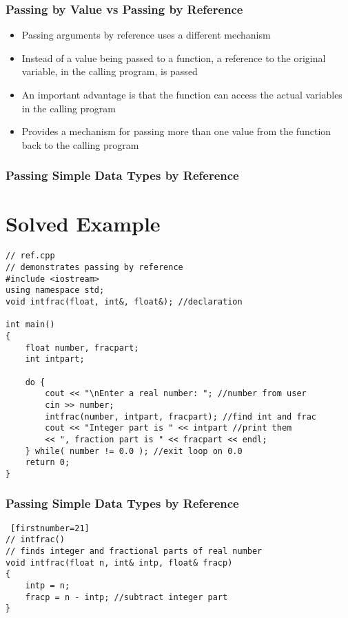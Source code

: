 \documentclass{beamer}
\begin{document}
\begin{frame}
    \frametitle{Passing by Value vs Passing by Reference}
    \begin{itemize}
        \item Passing arguments by reference uses a different mechanism
        \item Instead of a value being passed to a function, a reference to the original variable, in the calling program, is passed
        \item An important advantage is that the function can access the actual variables in the calling program
        \item Provides a mechanism for passing more than one value from the function back to the calling program
    \end{itemize}
\end{frame}

\begin{frame} [fragile]
    \frametitle{Passing Simple Data Types by Reference}
    \section{Solved Example} %
    \label{sec:solved_example}
    \lstset{style=mystyle}
\begin{lstlisting}
// ref.cpp
// demonstrates passing by reference
#include <iostream>
using namespace std;
void intfrac(float, int&, float&); //declaration

int main()
{
    float number, fracpart;
    int intpart;

    do {
        cout << "\nEnter a real number: "; //number from user
        cin >> number;
        intfrac(number, intpart, fracpart); //find int and frac
        cout << "Integer part is " << intpart //print them
        << ", fraction part is " << fracpart << endl;
    } while( number != 0.0 ); //exit loop on 0.0
    return 0;
}
\end{lstlisting}
\end{frame}

\begin{frame} [fragile]
    \frametitle{Passing Simple Data Types by Reference}
    \lstset{style=mystyle}
\begin{lstlisting} [firstnumber=21]
// intfrac()
// finds integer and fractional parts of real number
void intfrac(float n, int& intp, float& fracp)
{
    intp = n;
    fracp = n - intp; //subtract integer part
}
\end{lstlisting}
\end{frame}
\end{document}
